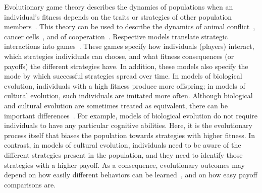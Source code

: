 \documentclass[11pt]{article}
\theoremstyle{plainCl1}
\theoremstyle{plainCl2}
\begin{document}
Evolutionary game theory describes the dynamics of populations when an individual's fitness depends on the traits or strategies of other population members~\cite{hofbauer1998evolutionary, nowak:Nature:2004, hauert2005game,Traulsen:PhilTrans:2022}.  
This theory can be used to describe the dynamics of animal conflict~\citep{maynard-smith:Nature:1973}, cancer cells~\citep{Stein:PTRS:2023}, and of cooperation~\citep{nowak:Science:2006}. 
Respective models translate strategic interactions into games~\cite{smith1982evolution}. 
These games specify how individuals (players) interact, which strategies individuals can choose, and what fitness consequences (or payoffs) the different strategies have. 
In addition, these models also specify the mode by which successful strategies spread over time. 
In models of biological evolution, individuals with a high fitness produce more offspring; in models of cultural evolution, such individuals are imitated more often. 
Although biological and cultural evolution are sometimes treated as equivalent, there can be important differences~\citep{Wu2015,Smolla:PTRS:2021,Denton:TPB:2022}. 
For example, models of biological evolution do not require individuals to have any particular cognitive abilities.
Here, it is the evolutionary process itself that biases the population towards strategies with higher fitness. 
In contrast, in models of cultural evolution, individuals need to be aware of the different strategies present in the population, and they need to identify those strategies with a higher payoff. 
As a consequence, evolutionary outcomes may depend on how easily different behaviors can be learned~\citep{Chatterjee:JTB:2012}, and on how easy payoff comparisons are. 

\end{document}

